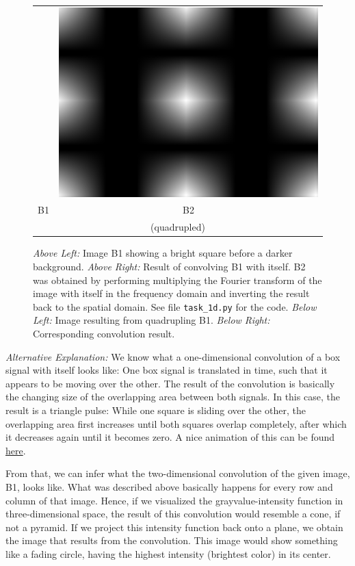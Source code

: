 \documentclass[a4paper,twocolumn]{article}
\begin{document}
\begin{figure} [t]
\begin{tabular}{c c}
			&
			\includegraphics[width=0.8\columnwidth]{figures/B2_ext.png}\\
			B1 & B2\\
			\multicolumn{2}{c}{(quadrupled)}
		\end{tabular}
		\caption{\textit{Above Left:} Image B1 showing a bright square before a darker background. \textit{Above Right:} Result of convolving B1 with itself. B2 was obtained by performing multiplying the Fourier transform of the image with itself in the frequency domain and inverting the result back to the spatial domain. See file \texttt{task\_1d.py} for the code. \textit{Below Left:} Image resulting from quadrupling B1. \textit{Below Right:} Corresponding convolution result.}
		\label{fig:task_1d}
	\end{figure}
	
	\vspace{12pt}
	\textit{Alternative Explanation:}
	We know what a one-dimensional convolution of a box signal with itself looks like: One box signal is translated in time, such that it appears to be moving over the other. The result of the convolution is basically the changing size of the overlapping area between both signals. In this case, the result is a triangle pulse: While one square is sliding over the other, the overlapping area first increases until both squares overlap completely, after which it decreases again until it becomes zero. A nice animation of this can be found \href{https://en.wikipedia.org/wiki/Convolution#/media/File:Convolution_of_box_signal_with_itself2.gif}{here}.
	
	From that, we can infer what the two-dimensional convolution of the given image, B1, looks like. What was described above basically happens for every row and column of that image. Hence, if we visualized the grayvalue-intensity function in three-dimensional space, the result of this convolution would resemble a cone, if not a pyramid. If we project this intensity function back onto a plane, we obtain the image that results from the convolution. This image would show something like a fading circle, having the highest intensity (brightest color) in its center.
	
\end{document}
